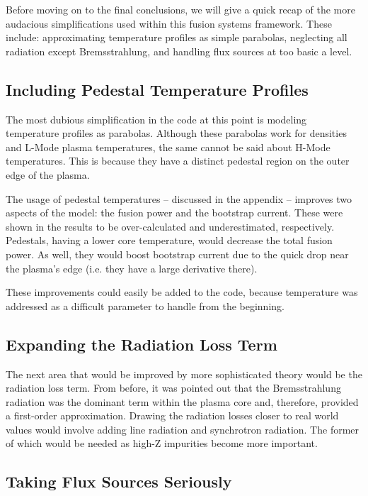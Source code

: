 Before moving on to the final conclusions, we will give a quick recap of the more audacious simplifications used within this fusion systems framework. These include: approximating temperature profiles as simple parabolas, neglecting all radiation except Bremsstrahlung, and handling flux sources at too basic a level.

\subsection{Including Pedestal Temperature Profiles}

The most dubious simplification in the code at this point is modeling temperature profiles as parabolas. Although these parabolas work for densities and L-Mode plasma temperatures, the same cannot be said about H-Mode temperatures. This is because they have a distinct pedestal region on the outer edge of the plasma.

The usage of pedestal temperatures -- discussed in the appendix -- improves two aspects of the model: the fusion power and the bootstrap current. These were shown in the results to be over-calculated and underestimated, respectively. Pedestals, having a lower core temperature, would decrease the total fusion power. As well, they would boost bootstrap current due to the quick drop near the plasma's edge (i.e. they have a large derivative there). 

These improvements could easily be added to the code, because temperature was addressed as a difficult parameter to handle from the beginning.

\subsection{Expanding the Radiation Loss Term}

The next area that would be improved by more sophisticated theory would be the radiation loss term. From before, it was pointed out that the Bremsstrahlung radiation was the dominant term within the plasma core and, therefore, provided a first-order approximation. Drawing the radiation losses closer to real world values would involve adding line radiation and synchrotron radiation. The former of which would be needed as high-Z impurities become more important.

\subsection{Taking Flux Sources Seriously}

